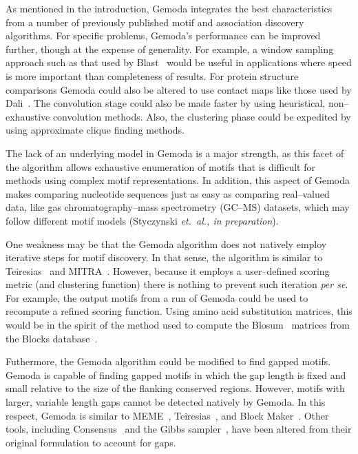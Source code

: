 As mentioned in the introduction, Gemoda integrates the
best characteristics from a number of previously published
motif and association discovery algorithms.  For
specific problems, Gemoda's performance can be improved
further, though at the expense of generality.
For example, a window sampling approach such as that used
by Blast~\citep{altschul1997gapped} would be useful in applications where speed is
more important than completeness of results.  For protein
structure comparisons Gemoda could also be altered to use
contact maps like those used by Dali~\citep{holm1993protein}.  The
convolution stage could also be made faster by using heuristical,
non--exhaustive convolution methods.  Also, the clustering phase
could be expedited by using approximate clique finding methods.

    The lack of
    an underlying model in Gemoda is a major strength, as this
    facet of the algorithm allows exhaustive enumeration
    of motifs that is difficult for methods using
    complex motif representations.  In addition, this
    aspect of Gemoda makes comparing nucleotide sequences
    just as easy as comparing real--valued data, like gas
    chromatography--mass spectrometry (GC--MS) datasets,
    which may follow different motif models (Styczynski
    \emph{et.\ al., in preparation}).

    One weakness may be that the Gemoda algorithm does not natively
    employ iterative steps for motif discovery.  In that sense,
    the algorithm is similar to Teiresias~\citep{rigoutsos1998combinatorial}
    and MITRA~\citep{eskin2002finding}.  However, because it employs
    a user--defined scoring metric (and clustering function) there
    is nothing to prevent such iteration \emph{per se}.  For example,
    the output motifs from a run of Gemoda could be used to recompute
    a refined scoring function.  Using amino acid substitution matrices,
    this would be in the spirit of the method used to compute the
    Blosum~\citep{henikoff1992aminoacid} matrices from the Blocks
    database~\citep{henikoff1995automated}.

Futhermore, the Gemoda algorithm could be modified to
find gapped motifs.
 Gemoda is capable
    of finding gapped motifs in which the gap length
    is fixed and small relative to the size of the
    flanking conserved regions.  However, motifs
    with larger, variable length gaps cannot be
    detected natively by Gemoda.  In this respect,
    Gemoda is similar to MEME~\citep{bailey1994fitting},
    Teiresias~\citep{rigoutsos1998combinatorial}, and Block
    Maker~\citep{henikoff1995automated}.  Other tools,
    including Consensus~\citep{hertz1999identifying}
    and the Gibbs sampler~\citep{lawrence1993detecting},
    have been altered from their original formulation
    to account for gaps.

